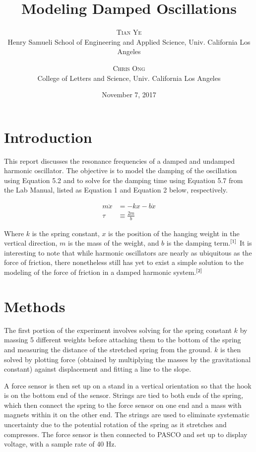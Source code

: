 \documentclass[twoside,twocolumn]{article}
\title{Modeling Damped Oscillations} %
\author{%
\textsc{Tian Ye} \\%
\normalsize Henry Samueli School of Engineering and Applied Science, Univ. California Los Angeles \\ %
\and %
\textsc{Chris Ong} \\%
\normalsize College of Letters and Science, Univ. California Los Angeles \\ %
}
\date{November 7, 2017} %
\begin{document}
\maketitle


\section{Introduction}

This report discusses the resonance frequencies of a damped and undamped harmonic oscillator. The objective is to model the damping of the oscillation using Equation 5.2 and to solve for the damping time using Equation 5.7 from the Lab Manual, listed as Equation 1 and Equation 2 below, respectively.

\footnotesize
\begin{align}
m\ddot{x}&= -kx - b\dot{x} \\
\tau &\equiv \frac{2m}{b}
\end{align}
\normalsize

Where $k$ is the spring constant, $x$ is the position of the hanging weight in the vertical direction, $m$ is the mass of the weight, and $b$ is the damping term.$\textsuperscript{[1]}$  It is interesting to note that while harmonic oscillators are nearly as ubiquitous as the force of friction, there nonetheless still has yet to exist a simple solution to the modeling of the force of friction in a damped harmonic system.$\textsuperscript{[2]}$


\section{Methods}

The first portion of the experiment involves solving for the spring constant $k$ by massing 5 different weights before attaching them to the bottom of the spring and measuring the distance of the stretched spring from the ground. $k$ is then solved by plotting force (obtained by multiplying the masses by the gravitational constant) against displacement and fitting a line to the slope.

\hfill

\noindent A force sensor is then set up on a stand in a vertical orientation so that the hook is on the bottom end of the sensor. Strings are tied to both ends of the spring, which then connect the spring to the force sensor on one end and a mass with magnets within it on the other end. The strings are used to eliminate systematic uncertainty due to the potential rotation of the spring as it stretches and compresses. The force sensor is then connected to PASCO and set up to display voltage, with a sample rate of 40 Hz. 
\end{document}
